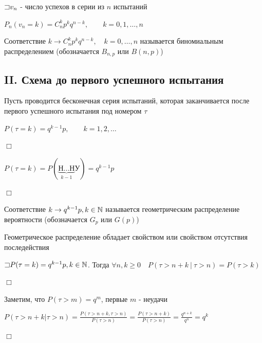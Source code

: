 \documentclass[12pt]{article}
\begin{document}
    $\mathord{\sqsupset} v_n$ - число успехов в серии из $n$ испытаний

    $P_n(v_n = k) = C^k_n p^k q^{n - k}, \quad\quad k = 0, 1, \dots, n$

    \Def Соответствие $k \rightarrow C^k_n p^k q^{n - k}, \quad k = 0, \dots, n$ называется биномиальным распределением
    (обозначается $B_{n,p}$ или $B(n, p)$)

    \subsection{II. Схема до первого успешного испытания}

    Пусть проводится бесконечная серия испытаний, которая заканчивается после первого успешного испытания
    под номером $\tau$

    \begin{MyTheorem}
        \Ths $P(\tau = k) = q^{k - 1} p, \quad\quad k = 1, 2, \dots$
    \end{MyTheorem}

    \begin{MyProof}
        $\Box$

        $P(\tau = k) = P(\underset{k - 1}{\underbrace{\text{Н}\dots\text{Н}}}\text{У}) = q^{k - 1}p$

        $\Box$
    \end{MyProof}

    \Def Соответствие $k \rightarrow q^{k - 1} p, k \in \mathbb{N}$ называется геометрическим
    распределение вероятности (обозначается $G_p$ или $G(p)$)

    \Nota Геометрическое распределение обладает свойством  или свойством отсутствия
    последействия

    \begin{MyTheorem}
        \Ths $\mathord{\sqsupset} P(\tau = k) = q^{k - 1} p, k \in \mathbb{N}$. Тогда $\forall n, k \geq 0 \quad P(\tau > n + k \ | \ \tau > n) = P(\tau > k)$
    \end{MyTheorem}

    \begin{MyProof}
        $\Box$

        Заметим, что $P(\tau > m) = q^m$, первые $m$ - неудачи

        $P(\tau > n + k | \tau > n) = \frac{P(\tau > n + k, \tau > n)}{P(\tau > n)} = \frac{P(\tau > n + k)}{P(\tau > n)} = \frac{q^{n + k}}{q^n} = q^k$

        $\Box$
    \end{MyProof}
\end{document}

